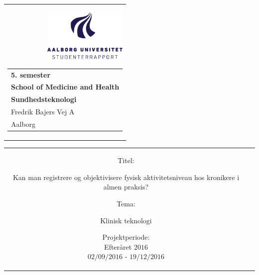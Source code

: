 % 
\thispagestyle{empty}
\begin{nopagebreak}
{\samepage 

\begin{tabular}{r}
\parbox{\textwidth}{ 
 {\includegraphics[height=2.5cm]{figures/aaulogo-da.png}}
\hfill \hspace{2cm} \parbox{8cm}
{\begin{tabular}{l} %
{\small \textbf{5. semester}}\\
{\small \textbf{School of Medicine and Health}}\\
{\small \textbf{Sundhedsteknologi}}\\
{\small Fredrik Bajers Vej $7$A} \\
{\small $9220$ Aalborg} \\
\end{tabular}}}
\end{tabular}

\hspace{-1.5cm}\begin{tabular}{cc}
\parbox{7cm}{
\begin{description}

\item {Titel:}

Kan man registrere og objektivisere fysisk aktivitetsniveau hos kronikere i almen praksis?\\

\item {Tema:} 

\small{
Klinisk teknologi
}

\end{description}

\parbox{8cm}{

\begin{description}
\item {Projektperiode:}\\
   Efteråret $2016$\\
   $02/09/2016$ - $19/12/2016$\\
   

\end{description}}}
\end{tabular}}
\end{nopagebreak}
